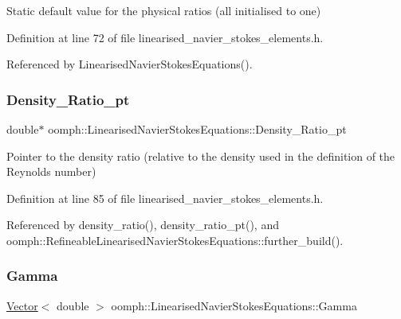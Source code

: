 Static default value for the physical ratios (all initialised to one) 



Definition at line 72 of file linearised\+\_\+navier\+\_\+stokes\+\_\+elements.\+h.



Referenced by Linearised\+Navier\+Stokes\+Equations().

\mbox{\label{classoomph_1_1LinearisedNavierStokesEquations_acc13e00d5614dbcb750fd91d415279ac}} 
\subsubsection{\texorpdfstring{Density\+\_\+\+Ratio\+\_\+pt}{Density\_Ratio\_pt}}
{\footnotesize\ttfamily double$\ast$ oomph\+::\+Linearised\+Navier\+Stokes\+Equations\+::\+Density\+\_\+\+Ratio\+\_\+pt\hspace{0.3cm}{\ttfamily [protected]}}



Pointer to the density ratio (relative to the density used in the definition of the Reynolds number) 



Definition at line 85 of file linearised\+\_\+navier\+\_\+stokes\+\_\+elements.\+h.



Referenced by density\+\_\+ratio(), density\+\_\+ratio\+\_\+pt(), and oomph\+::\+Refineable\+Linearised\+Navier\+Stokes\+Equations\+::further\+\_\+build().

\mbox{\label{classoomph_1_1LinearisedNavierStokesEquations_a2d1baad0906ab2dc98ae773aa6463b7e}} 
\subsubsection{\texorpdfstring{Gamma}{Gamma}}
{\footnotesize\ttfamily \hyperlink{classoomph_1_1Vector}{Vector}$<$ double $>$ oomph\+::\+Linearised\+Navier\+Stokes\+Equations\+::\+Gamma\hspace{0.3cm}{\ttfamily [static]}}



